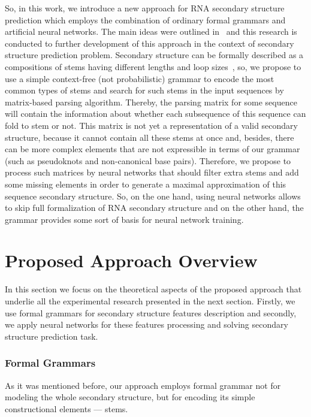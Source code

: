 \documentclass[runningheads]{llncs}
\begin{document}
So, in this work, we introduce a new approach for RNA secondary structure prediction which employs the combination of ordinary formal grammars and artificial neural networks. The main ideas were outlined in~\cite{grigorevcomposition,lunina2019secondary} and this research is conducted to further development of this approach in the context of secondary structure prediction problem. Secondary structure can be formally described as a compositions of stems having different lengths and loop sizes~\cite{MQbioinformatics19}, so, we propose to use a simple context-free (not probabilistic) grammar to encode the most common types of stems and search for such stems in the input sequences by matrix-based parsing algorithm. Thereby, the parsing matrix for some sequence will contain the information about whether each subsequence of this sequence can fold to stem or not. This matrix is not yet a representation of a valid secondary structure, because it cannot contain all these stems at once and, besides, there can be more complex elements that are not expressible in terms of our grammar (such as pseudoknots and non-canonical base pairs). Therefore, we propose to process such matrices by neural networks that should filter extra stems and add some missing elements in order to generate a maximal approximation of this sequence secondary structure. So, on the one hand, using neural networks allows to skip full formalization of RNA secondary structure and on the other hand, the grammar provides some sort of basis for neural network training.

\section{Proposed Approach Overview}
In this section we focus on the theoretical aspects of the proposed approach that underlie all the experimental research presented in the next section. Firstly, we use formal grammars for secondary structure features description and secondly, we apply neural networks for these features processing and solving secondary structure prediction task.

\subsubsection{Formal Grammars}
As it was mentioned before, our approach employs formal grammar not for modeling the whole secondary structure, but for encoding its simple constructional elements --- stems.
\end{document}
